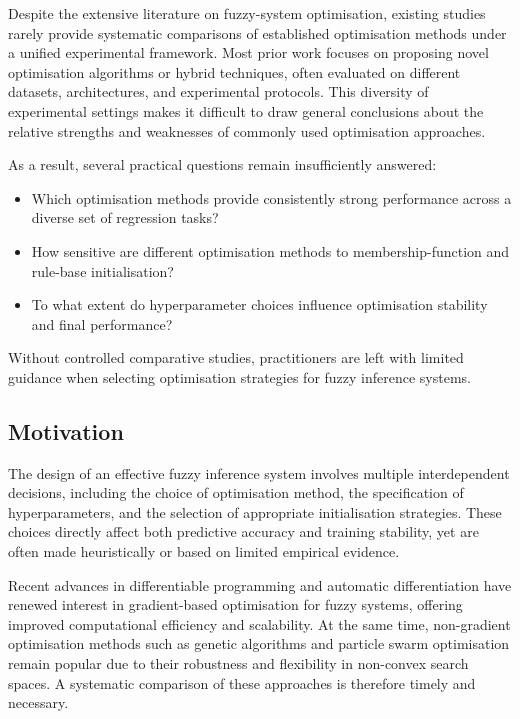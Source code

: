 \documentclass[a4paper,12pt,oneside]{article}
\begin{document}
Despite the extensive literature on fuzzy-system optimisation, existing studies rarely provide systematic comparisons of established optimisation methods under a unified experimental framework. Most prior work focuses on proposing novel optimisation algorithms or hybrid techniques, often evaluated on different datasets, architectures, and experimental protocols. This diversity of experimental settings makes it difficult to draw general conclusions about the relative strengths and weaknesses of commonly used optimisation approaches.

As a result, several practical questions remain insufficiently answered:
\begin{itemize}
    \item Which optimisation methods provide consistently strong performance across a diverse set of regression tasks?
    \item How sensitive are different optimisation methods to membership-function and rule-base initialisation?
    \item To what extent do hyperparameter choices influence optimisation stability and final performance?
\end{itemize}

Without controlled comparative studies, practitioners are left with limited guidance when selecting optimisation strategies for fuzzy inference systems.

\subsection{Motivation}

The design of an effective fuzzy inference system involves multiple interdependent decisions, including the choice of optimisation method, the specification of hyperparameters, and the selection of appropriate initialisation strategies. These choices directly affect both predictive accuracy and training stability, yet are often made heuristically or based on limited empirical evidence.

Recent advances in differentiable programming and automatic differentiation have renewed interest in gradient-based optimisation for fuzzy systems, offering improved computational efficiency and scalability. At the same time, non-gradient optimisation methods such as genetic algorithms and particle swarm optimisation remain popular due to their robustness and flexibility in non-convex search spaces. A systematic comparison of these approaches is therefore timely and necessary.
\end{document}
